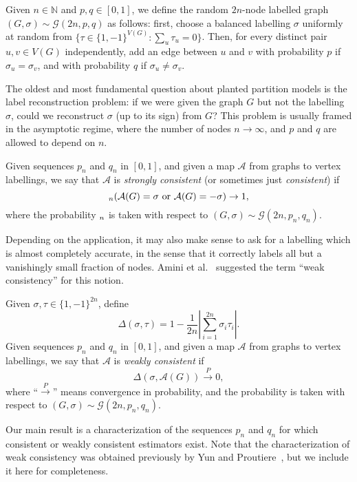 \documentclass[EJP]{ejpecp}
\newcommand{\N}{\mathbb{N}}
\newcommand{\1}[1]{\mathbbm{1}_{\{#1\}}}
\newcommand{\calG}{\mathcal{G}}
\newcommand{\calA}{\mathcal{A}}
\let\Pr\relax
\DeclareMathOperator{\Pr}{Pr}
\newcommand{\toP}{\stackrel{P}{\to}}
\begin{document}
\begin{definition}
Given $n \in \N$ and $p, q \in [0, 1]$, we define the random $2n$-node
labelled graph $(G, \sigma) \sim \calG(2n, p, q)$ as follows:
first, choose a balanced labelling $\sigma$ uniformly at random
from $\{\tau \in \{1, -1\}^{V(G)}: \sum_u \tau_u = 0\}$.
Then, for every distinct pair $u, v \in V(G)$ independently,
add an edge between $u$ and $v$ with probability $p$ if $\sigma_u = \sigma_v$,
and with probability $q$ if $\sigma_u \ne \sigma_v$.
\end{definition}

The oldest and most fundamental question about planted partition models
is the label reconstruction problem: if we were given the graph $G$ but not
the labelling $\sigma$, could we reconstruct $\sigma$ (up to its sign) from
$G$? This problem is usually framed in the asymptotic regime, where
the number of nodes $n \to \infty$, and $p$ and $q$ are allowed to depend
on $n$.

\begin{definition}
 Given sequences $p_n$ and $q_n$ in $[0, 1]$, and given a map $\calA$
 from graphs to vertex labellings, we say that $\calA$ is
 \emph{strongly consistent} (or sometimes just \emph{consistent}) if
 \[
   \Pr_n(\calA(G) = \sigma \text{ or } \calA(G) = -\sigma) \to 1,
 \]
 where the probability $\Pr_n$ is taken with respect to
 $(G, \sigma) \sim \calG(2n, p_n, q_n)$.
\end{definition}

Depending on the application, it may also make sense to ask for a
labelling which is almost completely accurate, in the sense that
it correctly labels all but a vanishingly small fraction of nodes.
Amini et al.~\cite{ACBL:13} suggested the term ``weak consistency'' for this notion.

\begin{definition}
 Given $\sigma, \tau \in \{1, -1\}^{2n}$, define
 \[
  \Delta(\sigma, \tau) = 1 - \frac 1{2n} \left|\sum_{i=1}^{2n} \sigma_i \tau_i\right|.
 \]
  Given sequences $p_n$ and $q_n$ in $[0, 1]$, and given a map $\calA$
 from graphs to vertex labellings, we say that $\calA$ is
 \emph{weakly consistent} if
 \[
  \Delta(\sigma, \calA(G)) \toP 0,
 \]
 where ``$\toP$'' means convergence in probability, and
 the probability is taken with respect to
 $(G, \sigma) \sim \calG(2n, p_n, q_n)$.
\end{definition}

Our main result is a characterization of the sequences $p_n$ and $q_n$
for which consistent or weakly consistent estimators exist.
Note that the characterization of weak consistency was obtained previously
by Yun and Proutiere~\cite{YunProutiere:14}, but we include it here
for completeness.
\end{document}
